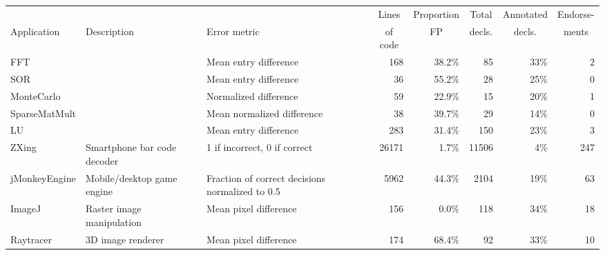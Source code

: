 
\begin{tabular}{l >{\raggedright}p{0.8in} >{\raggedright}p{1.25in} r r r r r}
& & & \multicolumn{1}{c}{Lines} & \multicolumn{1}{c}{Proportion} &
\multicolumn{1}{c}{Total} & \multicolumn{1}{c}{Annotated} &
\multicolumn{1}{c}{Endorse-} \tabularnewline
Application & Description & Error metric &
\multicolumn{1}{c}{of code} & \multicolumn{1}{c}{FP} &
\multicolumn{1}{c}{decls.} &
\multicolumn{1}{c}{decls.} & \multicolumn{1}{c}{ments} \tabularnewline
\midrule
FFT & \multirow{5}{1.5in}{SciMark2 kernels} & Mean entry difference  & 168 & 38.2\% & 85 & 33\% & 2 \tabularnewline
SOR & & Mean entry difference  & 36 & 55.2\% & 28 & 25\% & 0 \tabularnewline
MonteCarlo & & Normalized difference  & 59 & 22.9\% & 15 & 20\% & 1 \tabularnewline
SparseMatMult & & Mean normalized difference  & 38 & 39.7\% & 29 & 14\% & 0 \tabularnewline
LU & & Mean entry difference  & 283 & 31.4\% & 150 & 23\% & 3 \tabularnewline[1.5ex]
ZXing & Smartphone bar code decoder & 1 if incorrect, 0 if correct  & 26171 & 1.7\% & 11506 & 4\% & 247 \tabularnewline
jMonkeyEngine & Mobile/desktop game engine & Fraction of correct decisions normalized to 0.5  & 5962 & 44.3\% & 2104 & 19\% & 63 \tabularnewline
ImageJ & Raster image manipulation & Mean pixel difference  & 156 & 0.0\% & 118 & 34\% & 18 \tabularnewline
Raytracer & 3D image renderer & Mean pixel difference  & 174 & 68.4\% & 92 & 33\% & 10 \tabularnewline
\end{tabular}
